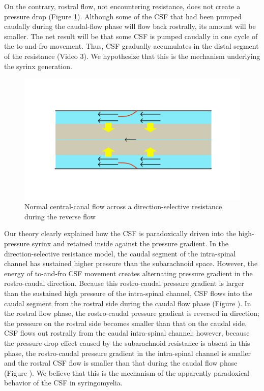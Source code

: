 \documentclass[fleqn,10pt]{wlscirep}
\begin{document}
On the contrary, rostral flow, not encountering resistance, does not create
a pressure drop (Figure \ref{fig:pump_open}). Although some of the CSF that
had been pumped caudally during the caudal-flow phase will flow back
rostrally, its amount will be smaller. The net result will be that some CSF
is pumped caudally in one cycle of the to-and-fro movement. Thus, CSF
gradually accumulates in the distal segment of the resistance (Video 3). We
hypothesize that this is the mechanism underlying the syrinx generation.

\begin{figure}[hbt]
    \centering
    \includegraphics[width=\textwidth]{pumping_mechanism_open.jpg}
    \caption{Normal central-canal flow across a direction-selective
    resistance during the reverse flow}
    \label{fig:pump_open}
\end{figure}

Our theory clearly explained how the CSF is paradoxically driven into the
high-pressure syrinx and retained inside against the pressure gradient.  In
the direction-selective resistance model, the caudal segment of the
intra-spinal channel has sustained higher pressure than the subarachnoid
space. However, the energy of to-and-fro CSF movement creates alternating
pressure gradient in the rostro-caudal direction. Because this
rostro-caudal pressure gradient is larger than the sustained high pressure
of the intra-spinal channel, CSF flows into the caudal segment from the
rostral side during the caudal flow phase (Figure \cite{fig:pump_close}).
In the rostral flow phase, the rostro-caudal pressure gradient is reversed
in direction; the pressure on the rostral side becomes smaller than that on
the caudal side. CSF flows out rostrally from the caudal intra-spinal
channel; however, because the pressure-drop effect caused by the
subarachnoid resistance is absent in this phase, the rostro-caudal pressure
gradient in the intra-spinal channel is smaller and the rostral CSF flow is
smaller than that during the caudal flow phase (Figure
\cite{fig:pump_open}). We believe that this is the mechanism of the
apparently paradoxical behavior of the CSF in syringomyelia.
\end{document}

